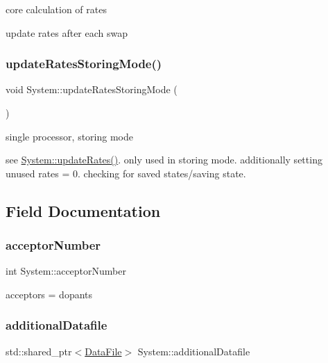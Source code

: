 core calculation of rates

update rates after each swap \mbox{\label{classSystem_a2b1664dce6144f6a8104ebb678fb5c8b}} 
\subsubsection{\texorpdfstring{update\+Rates\+Storing\+Mode()}{updateRatesStoringMode()}}
{\footnotesize\ttfamily void System\+::update\+Rates\+Storing\+Mode (\begin{DoxyParamCaption}{ }\end{DoxyParamCaption})\hspace{0.3cm}{\ttfamily [private]}}

single processor, storing mode

see \hyperlink{classSystem_a1f50240f4eecb60f8302307e6df814af}{System\+::update\+Rates()}. only used in storing mode. additionally setting unused rates = 0. checking for saved states/saving state. 

\subsection{Field Documentation}
\mbox{\label{classSystem_a1537030f9695aa1ec4184cd5669c73c3}} 
\subsubsection{\texorpdfstring{acceptor\+Number}{acceptorNumber}}
{\footnotesize\ttfamily int System\+::acceptor\+Number\hspace{0.3cm}{\ttfamily [private]}}

acceptors = dopants \mbox{\label{classSystem_a93078f871a37d1a87c188802f7f78f24}} 
\subsubsection{\texorpdfstring{additional\+Datafile}{additionalDatafile}}
{\footnotesize\ttfamily std\+::shared\+\_\+ptr$<$\hyperlink{classDataFile}{Data\+File}$>$ System\+::additional\+Datafile\hspace{0.3cm}{\ttfamily [private]}}

